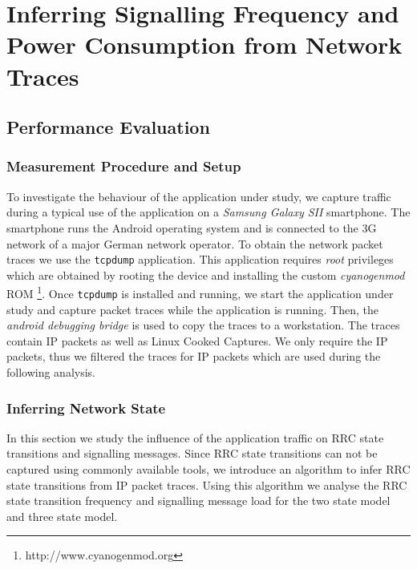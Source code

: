 \section{Inferring Signalling Frequency and Power Consumption from Network Traces}\label{sec:network:network_traces}
\cite{Schwartz2013a}
\subsection{Performance Evaluation}\label{sec:network:network_traces:performance_evaluation}
\subsubsection*{Measurement Procedure and Setup}\label{sec:network:network_traces:performance_evaluation:measurement}
To investigate the behaviour of the application under study, we capture traffic during a typical use of the application on a \emph{Samsung Galaxy SII} smartphone.
The smartphone runs the Android operating system and is connected to the \gls{3G} network of a major German network operator.
To obtain the network packet traces we use the \texttt{tcpdump} application.
This application requires \emph{root} privileges which are obtained by rooting the device and installing the custom \emph{cyanogenmod} ROM \footnote{http://www.cyanogenmod.org}.
Once \texttt{tcpdump} is installed and running, we start the application under study and capture packet traces while the application is running.
Then, the \emph{android debugging bridge} is used to copy the traces to a workstation.
The traces contain \gls{IP} packets as well as Linux Cooked Captures.
We only require the \gls{IP} packets, thus we filtered the traces for \gls{IP} packets which are used during the following analysis.

\subsubsection*{Inferring Network State}\label{sec:network:network_traces:performance_evaluation:inferring_network_state}
In this section we study the influence of the application traffic on \gls{RRC} state transitions and signalling messages.
Since \gls{RRC} state transitions can not be captured using commonly available tools, we introduce an algorithm to infer \gls{RRC} state transitions from \gls{IP} packet traces.
Using this algorithm we analyse the \gls{RRC} state transition frequency and signalling message load for the two state model and three state model.

